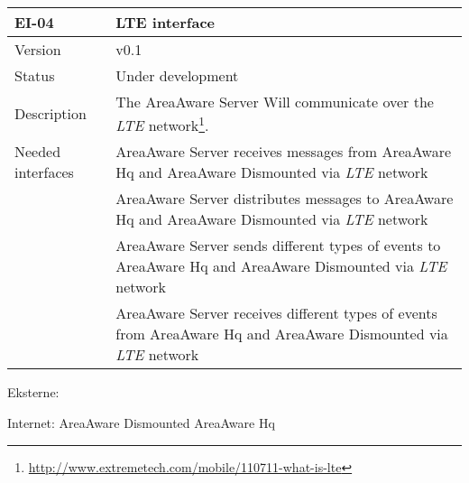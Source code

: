 \begin{longtable}{| p{3.5cm} |  p{10cm} | }
	\hline
	\textbf{EI-04} &  \textbf{LTE interface} \\
	\hline
	Version & v0.1 \\
	\hline
	Status & Under development \\
	\hline
	Description & The AreaAware Server Will communicate over the \emph{LTE} network\footnote{\url{http://www.extremetech.com/mobile/110711-what-is-lte}}.
	\\
	\hline
	Needed interfaces 
	& AreaAware Server receives messages from AreaAware Hq and AreaAware Dismounted via \emph{LTE} network \\
	& AreaAware Server distributes messages to AreaAware Hq and AreaAware Dismounted via \emph{LTE} network \\ 
	& AreaAware Server sends different types of events to AreaAware Hq and AreaAware Dismounted via \emph{LTE} network \\
	& AreaAware Server receives different types of events from AreaAware Hq and AreaAware Dismounted via \emph{LTE} network \\
	\hline
\end{longtable}


Eksterne:

Internet: 
AreaAware Dismounted
AreaAware Hq
